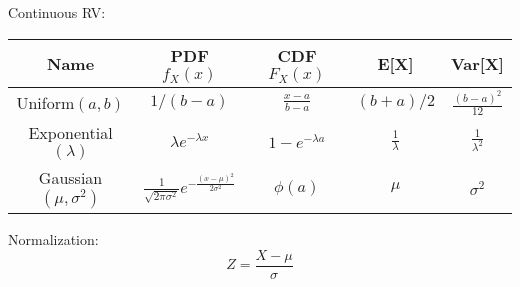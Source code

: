 \documentclass{article}
\theoremstyle{remark}
\begin{document}
Continuous RV:\@
\begin{table}[!htbp]
    \centering
    \begin{tabular}{ c c c c c }
        \toprule
        Name                        & PDF \(f_X(x)\)                                                        & CDF  \(F_X(x)\)      & E[X]                  & Var[X]                   \\
        \midrule
        Uniform\((a,b)\)            & \(1/(b-a)\)                                                           & \(\frac{x-a}{b-a}\)  & \((b+a)/2\)           & \(\frac{{(b-a)}^2}{12}\) \\
        Exponential\((\lambda)\)    & \(\lambda e^{-\lambda x}\)                                            & \(1-e^{-\lambda a}\) & \(\frac{1}{\lambda}\) & \(\frac{1}{\lambda^2}\)  \\
        Gaussian\((\mu, \sigma^2)\) & \(\frac{1}{\sqrt{2\pi \sigma^2}}e^{-\frac{{(x-\mu )}^2}{2\sigma^2}}\) & \(\phi(a)\)          & \(\mu \)              & \(\sigma ^2\)            \\
        \bottomrule
    \end{tabular}
\end{table}

Normalization:
\[
    Z = \frac{X-\mu}{\sigma}
\]
\end{document}
